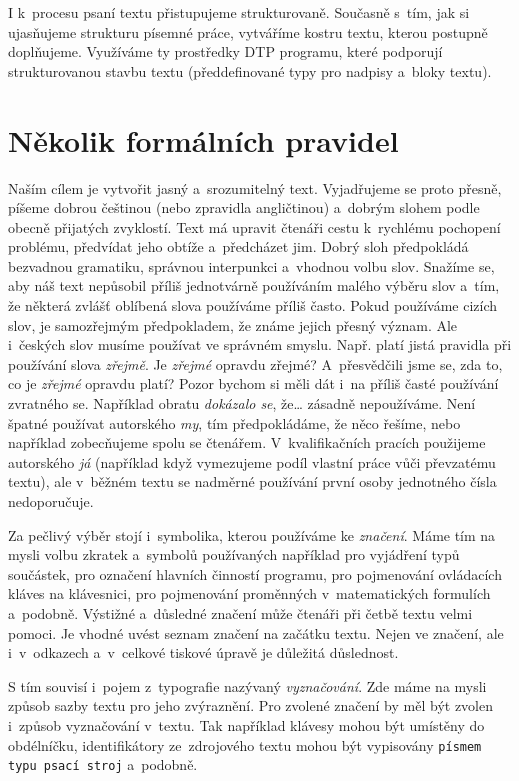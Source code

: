 I k~procesu psaní textu přistupujeme strukturovaně. Současně s~tím, jak si ujasňujeme strukturu písemné práce, vytváříme kostru textu, kterou postupně doplňujeme. Využíváme ty prostředky DTP programu, které podporují strukturovanou stavbu textu (předdefinované typy pro nadpisy a~bloky textu). 


\chapter{Několik formálních pravidel}
Naším cílem je vytvořit jasný a~srozumitelný text. Vyjadřujeme se proto přesně, píšeme dobrou češtinou (nebo zpravidla angličtinou) a~dobrým slohem podle obecně přijatých zvyklostí. Text má upravit čtenáři cestu k~rychlému pochopení problému, předvídat jeho obtíže a~předcházet jim. Dobrý sloh předpokládá bezvadnou gramatiku, správnou interpunkci a~vhodnou volbu slov. Snažíme se, aby náš text nepůsobil příliš jednotvárně používáním malého výběru slov a~tím, že některá zvlášť oblíbená slova používáme příliš často. Pokud používáme cizích slov, je samozřejmým předpokladem, že známe jejich přesný význam. Ale i~českých slov musíme používat ve správném smyslu. Např. platí jistá pravidla při používání slova {\it zřejmě}. Je {\it zřejmé} opravdu zřejmé? A~přesvědčili jsme se, zda to, co je {\it zřejmé} opravdu platí? Pozor bychom si měli dát i~na příliš časté používání zvratného se. Například obratu {\it dokázalo se}, že\ldots{} zásadně nepoužíváme. Není špatné používat autorského {\it my}, tím předpokládáme, že něco řešíme, nebo například zobecňujeme spolu se čtenářem. V~kvalifikačních pracích použijeme autorského {\it já} (například když vymezujeme podíl vlastní práce vůči převzatému textu), ale v~běžném textu se nadměrné používání první osoby jednotného čísla nedoporučuje.

Za pečlivý výběr stojí i~symbolika, kterou používáme ke {\it značení}. Máme tím na mysli volbu zkratek a~symbolů používaných například pro vyjádření typů součástek, pro označení hlavních činností programu, pro pojmenování ovládacích kláves na klávesnici, pro pojmenování proměnných v~matematických formulích a~podobně. Výstižné a~důsledné značení může čtenáři při četbě textu velmi pomoci. Je vhodné uvést seznam značení na začátku textu. Nejen ve značení, ale i~v~odkazech a~v~celkové tiskové úpravě je důležitá důslednost.

S tím souvisí i~pojem z~typografie nazývaný {\it vyznačování}. Zde máme na mysli způsob sazby textu pro jeho zvýraznění. Pro zvolené značení by měl být zvolen i~způsob vyznačování v~textu. Tak například klávesy mohou být umístěny do obdélníčku, identifikátory ze~zdrojového textu mohou být vypisovány {\tt písmem typu psací stroj} a~podobně.

